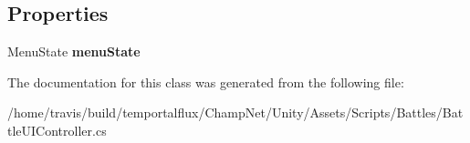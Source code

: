 \subsection*{Properties}
\begin{DoxyCompactItemize}
\item 
\hypertarget{group__client_ga4f8584c7f4ebdeb9b29bf982dc8a5e5d}{Menu\-State {\bfseries menu\-State}}\label{group__client_ga4f8584c7f4ebdeb9b29bf982dc8a5e5d}

\end{DoxyCompactItemize}


The documentation for this class was generated from the following file\-:\begin{DoxyCompactItemize}
\item 
/home/travis/build/temportalflux/\-Champ\-Net/\-Unity/\-Assets/\-Scripts/\-Battles/Battle\-U\-I\-Controller.\-cs\end{DoxyCompactItemize}
